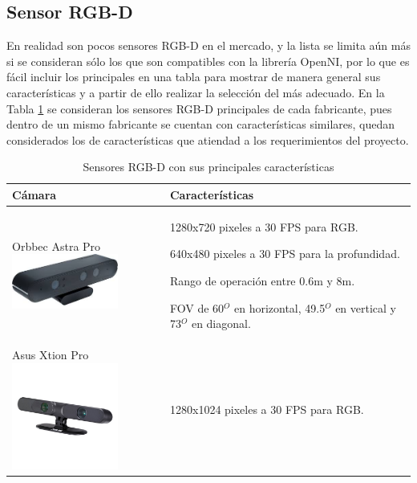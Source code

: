 \subsection{Sensor RGB-D}
\label{ssec:rgbd}
En realidad son pocos sensores RGB-D en el mercado, y la lista se limita aún más si se consideran sólo los que son compatibles con la librería OpenNI, por lo que es fácil incluir los principales en una tabla para mostrar de manera general sus características y a partir de ello realizar la selección del más adecuado. En la Tabla \ref{tab:rgbd} se consideran los sensores RGB-D principales de cada fabricante, pues dentro de un mismo fabricante se cuentan con características similares, quedan considerados los de características que atiendad a los requerimientos del proyecto.
\begin{table}[htbp!]
	\caption{Sensores RGB-D con sus principales características}
	\label{tab:rgbd}
	\begin{center}
		\begin{tabular}{|p{5cm}|p{7cm}|}
			\hline
			{\bf Cámara} & {\bf Características}\\
			\hline
			Orbbec Astra Pro \includegraphics[width=3.5cm]{./Figuras/Orbbec} &
			\begin{compactitem}
				\item 1280x720 pixeles a 30 FPS para RGB.
				\item 640x480 pixeles a 30 FPS para la profundidad.
				\item Rango de operación entre 0.6m y 8m.
				\item FOV de 60$^{O}$ en horizontal, 49.5$^{O}$ en vertical y 73$^{O}$ en diagonal.
			\end{compactitem}\\
			\hline
			Asus Xtion Pro \includegraphics[width=3.5cm]{./Figuras/Asus} &
			\begin{compactitem}
				\item 1280x1024 pixeles a 30 FPS para RGB.

\end{compactitem}
\end{tabular}
\end{center}
\end{table}
